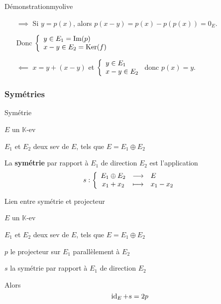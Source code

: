     \begin{demo}{Démonstration}{myolive}
        \begin{itemize}
            \item[$\implies$] Si $y = p(x)$, alors $p(x-y) = p(x)- p(p(x)) = 0_E$.
    
            Donc $\et{y \in E_1 = \Ima(p)}{x-y \in E_2 = \Ker(f)}$
            \item[$\impliedby$] $ x = y + (x-y)$ et $\et{y \in E_1}{x-y \in E_2}$ donc $p(x) = y$.
        \end{itemize}
    \end{demo}
    
    \subsubsection{Symétries}
    
    \begin{defi}{Symétrie}{}
        \begin{soient}
            \item $E$ un $\mathbb{K}$-ev
            \item $E_1$ et $E_2$ deux sev de $E$, tels que $E = E_1 \oplus E_2$
        \end{soient}
        La \textbf{symétrie} par rapport à $E_1$ de direction $E_2$ est l’application \[ \fonction{s}{E_1 \oplus E_2}{E}{x_1 + x_2}{x_1 - x_2} \]
    \end{defi}
    
    \begin{prop}{Lien entre symétrie et projecteur}{}
        \begin{soient}
            \item $E$ un $\mathbb{K}$-ev
            \item $E_1$ et $E_2$ deux sev de $E$, tels que $E = E_1 \oplus E_2$
            \item $p$ le projecteur sur $E_1$ parallèlement à $E_2$
            \item $s$ la symétrie par rapport à $E_1$ de direction $E_2$
        \end{soient}
        Alors \[ \operatorname{id}_E + s = 2p \]
    \end{prop}
    
